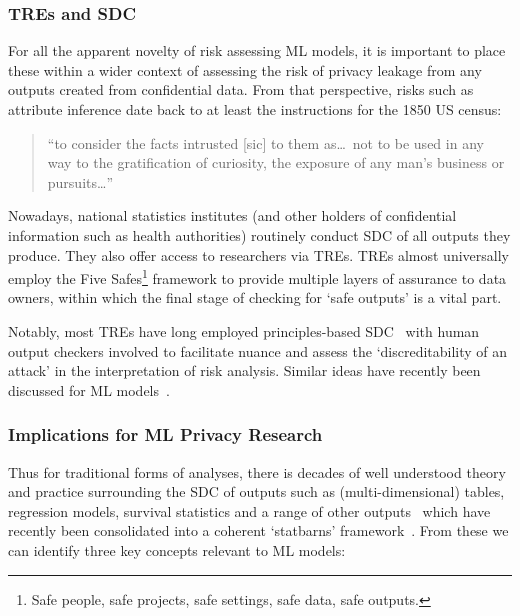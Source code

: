 \subsubsection{TREs and SDC}
For all the apparent novelty of risk assessing ML models, it is important to place these within a wider context of assessing the risk of privacy leakage from any outputs created from confidential data. From that perspective, risks such as attribute inference date back to at least the instructions for the 1850 US census:

\begin{quote}
    ``to consider the facts intrusted [sic] to them as\ldots~not to be used in any way to the gratification of curiosity, the exposure of any man's business or pursuits\ldots''~\cite{Ruggles:2023}
\end{quote}

Nowadays, national statistics institutes (and other holders of confidential information such as health authorities) routinely conduct SDC of all outputs they produce. They also offer access to researchers via TREs. TREs almost universally employ the Five Safes\footnote{Safe people, safe projects, safe settings, safe data, safe outputs.} framework to provide multiple layers of assurance to data owners, within which the final stage of checking for `safe outputs' is a vital part.

Notably, most TREs have long employed principles-based SDC~\cite{Alves:2020} with human output checkers involved to facilitate nuance and assess the `discreditability of an attack' in the interpretation of risk analysis. Similar ideas have recently been discussed for ML models~\cite{Rezaei:2023}. 

\subsubsection{Implications for ML Privacy Research}%
\label{subsec:struct_measures}

Thus for traditional forms of analyses, there is decades of well understood theory and practice surrounding the SDC of outputs such as (multi-dimensional) tables, regression models, survival statistics and a range of other outputs~\cite{Brandt:2010, Griffiths:2019} which have recently been consolidated into a coherent `statbarns' framework~\cite{Ritchie:2023}. From these we can identify three key concepts relevant to ML models:

